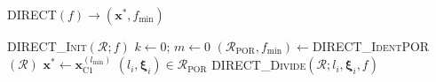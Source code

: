 ﻿\documentclass{jsarticle}
\begin{document}
\setcounter{algorithm}{5}
\begin{algorithm}[tbh]
\caption{\textsc{DIRECT}$(f)\rightarrow(\bm{x}^{*},f_{\mathrm{min}})$}
\label{alg:direct}
\begin{algorithmic}[1]
\State \textsc{DIRECT\_Init}$(\mathcal{R};f)$
\State $k\leftarrow 0$; $m\leftarrow 0$
  \State $(\mathcal{R}_{\mathrm{POR}},f_{\mathrm{min}})\leftarrow$\textsc{DIRECT\_IdentPOR}$(\mathcal{R})$
    \State $\bm{x}^{*}\leftarrow\bm{x}^{(l_{\mathrm{min}})}_{\mathrm{C}1}$
    \State {}
  \EndIf
    \State $(l_{i},\bm{\xi}_{i})\in\mathcal{R}_{\mathrm{POR}}$
    \State \textsc{DIRECT\_Divide}$(\mathcal{R};l_{i},\bm{\xi}_{i},f)$
  \EndWhile
\EndWhile
\end{algorithmic}
\end{algorithm}
\end{document}
